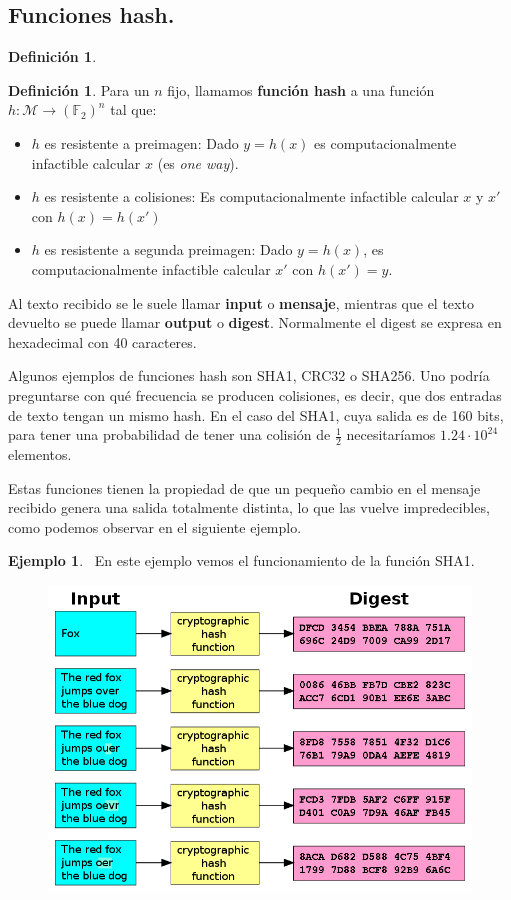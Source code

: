 \documentclass[twoside]{article}
\theoremstyle{definition}
\newtheorem{defi}[teorema]{Definición}
\newtheorem{ej}[teorema]{Ejemplo}
\begin{document}
\subsection{Funciones hash.}
\begin{defi}
\begin{defi}
Para un $n$ fijo, llamamos \textbf{función hash} a una función $h : \mathcal{M} \to (\mathbb{F}_2)^n$ tal que:
\begin{itemize}
	\item $h$ es resistente a preimagen: Dado $y=h(x)$ es computacionalmente infactible calcular $x$ (es \emph{one way}).
	\item $h$ es resistente a colisiones: Es computacionalmente infactible calcular $x$ y $x'$ con $h(x) = h(x')$
	\item $h$ es resistente a segunda preimagen: Dado $y=h(x)$, es computacionalmente infactible calcular $x'$ con $h(x')=y$.  
\end{itemize}
\end{defi}
Al texto recibido se le suele llamar \textbf{input} o \textbf{mensaje}, mientras que el texto devuelto se puede llamar \textbf{output} o \textbf{digest}. Normalmente el digest se expresa en hexadecimal con 40 caracteres. 
\end{defi}
Algunos ejemplos de funciones hash son SHA1, CRC32 o SHA256. Uno podría preguntarse con qué frecuencia se producen colisiones, es decir, que dos entradas de texto tengan un mismo hash. En el caso del SHA1, cuya salida es de 160 bits, para tener una probabilidad de tener una colisión de $\frac{1}{2}$ necesitaríamos $1.24\cdot 10^{24}$ elementos.

Estas funciones tienen la propiedad de que un pequeño cambio en el mensaje recibido genera una salida totalmente distinta, lo que las vuelve impredecibles, como podemos observar en el siguiente ejemplo.
	
\begin{ej}\
En este ejemplo vemos el funcionamiento de la función SHA1. 
\begin{figure}[h!]
\includegraphics[scale=0.4]{hashexample}
\end{figure}
\end{ej}
\end{document}
